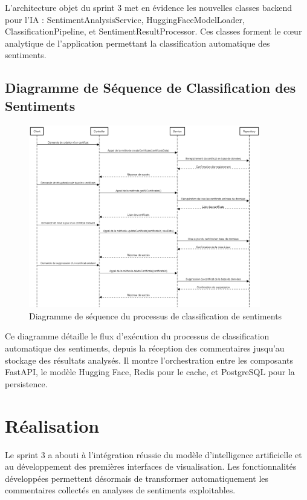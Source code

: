 L'architecture objet du sprint 3 met en évidence les nouvelles classes backend pour l'IA : SentimentAnalysisService, HuggingFaceModelLoader, ClassificationPipeline, et SentimentResultProcessor. Ces classes forment le cœur analytique de l'application permettant la classification automatique des sentiments.

\subsection{Diagramme de Séquence de Classification des Sentiments}

\begin{figure}[H]
\centering
\includegraphics[width=0.9\textwidth]{assets/images/seq-certifs.png}
\caption{Diagramme de séquence du processus de classification de sentiments}
\label{fig:sentiment-sequence}
\end{figure}

Ce diagramme détaille le flux d'exécution du processus de classification automatique des sentiments, depuis la réception des commentaires jusqu'au stockage des résultats analysés. Il montre l'orchestration entre les composants FastAPI, le modèle Hugging Face, Redis pour le cache, et PostgreSQL pour la persistence.

\section{Réalisation}

Le sprint 3 a abouti à l'intégration réussie du modèle d'intelligence artificielle et au développement des premières interfaces de visualisation. Les fonctionnalités développées permettent désormais de transformer automatiquement les commentaires collectés en analyses de sentiments exploitables.


